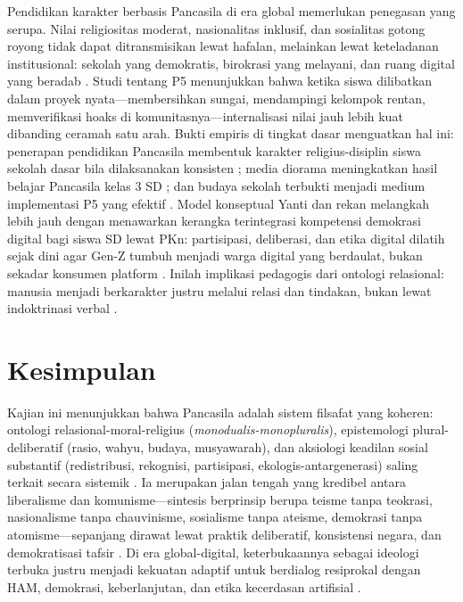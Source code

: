 \documentclass[journal]{IEEEtran}
\begin{document}
Pendidikan karakter berbasis Pancasila di era global memerlukan penegasan yang serupa. Nilai religiositas moderat, nasionalitas inklusif, dan sosialitas gotong royong tidak dapat ditransmisikan lewat hafalan, melainkan lewat keteladanan institusional: sekolah yang demokratis, birokrasi yang melayani, dan ruang digital yang beradab \cite{effend2024,basit2023}. Studi tentang P5 menunjukkan bahwa ketika siswa dilibatkan dalam proyek nyata---membersihkan sungai, mendampingi kelompok rentan, memverifikasi hoaks di komunitasnya---internalisasi nilai jauh lebih kuat dibanding ceramah satu arah. Bukti empiris di tingkat dasar menguatkan hal ini: penerapan pendidikan Pancasila membentuk karakter religius-disiplin siswa sekolah dasar bila dilaksanakan konsisten \cite{handayani2024}; media diorama meningkatkan hasil belajar Pancasila kelas 3 SD \cite{khairana2025}; dan budaya sekolah terbukti menjadi medium implementasi P5 yang efektif \cite{naim2023}. Model konseptual Yanti dan rekan melangkah lebih jauh dengan menawarkan kerangka terintegrasi kompetensi demokrasi digital bagi siswa SD lewat PKn: partisipasi, deliberasi, dan etika digital dilatih sejak dini agar Gen-Z tumbuh menjadi warga digital yang berdaulat, bukan sekadar konsumen platform \cite{yanti2026}. Inilah implikasi pedagogis dari ontologi relasional: manusia menjadi berkarakter justru melalui relasi dan tindakan, bukan lewat indoktrinasi verbal \cite{effend2024,kompas2023}.

\section{Kesimpulan}

Kajian ini menunjukkan bahwa Pancasila adalah sistem filsafat yang koheren: ontologi relasional-moral-religius (\textit{monodualis-monopluralis}), epistemologi plural-deliberatif (rasio, wahyu, budaya, musyawarah), dan aksiologi keadilan sosial substantif (redistribusi, rekognisi, partisipasi, ekologis-antargenerasi) saling terkait secara sistemik \cite{latif2018,pristiwiyanto2021,notonagoro1975}. Ia merupakan jalan tengah yang kredibel antara liberalisme dan komunisme---sintesis berprinsip berupa teisme tanpa teokrasi, nasionalisme tanpa chauvinisme, sosialisme tanpa ateisme, demokrasi tanpa atomisme---sepanjang dirawat lewat praktik deliberatif, konsistensi negara, dan demokratisasi tafsir \cite{madung2016,duha2022,madungmere2021}. Di era global-digital, keterbukaannya sebagai ideologi terbuka justru menjadi kekuatan adaptif untuk berdialog resiprokal dengan HAM, demokrasi, keberlanjutan, dan etika kecerdasan artifisial \cite{ulumhamida2018,kurniasih2016,kominfo2023,effend2024}.
\end{document}
